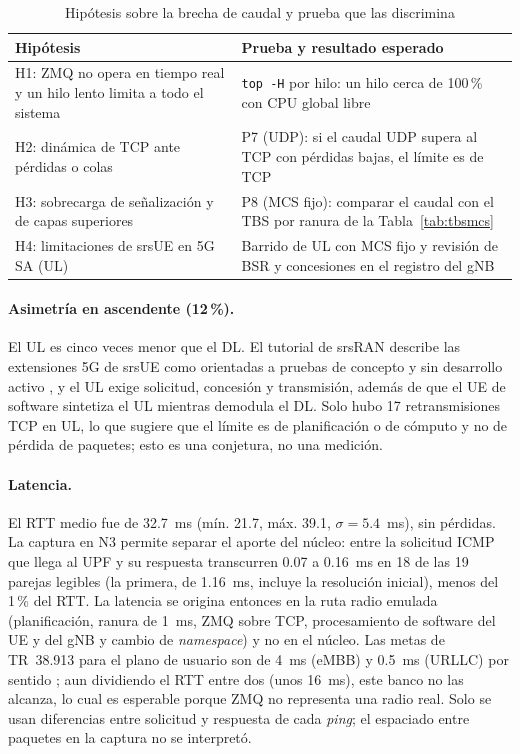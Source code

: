 \documentclass[conference]{IEEEtran}
\begin{document}
\begin{table}[!t]
\caption{Hipótesis sobre la brecha de caudal y prueba que las discrimina}
\label{tab:hip}
\centering
\footnotesize
\renewcommand{\arraystretch}{1.1}
\begin{tabular}{p{2.9cm}p{4.8cm}}
\toprule
\textbf{Hipótesis} & \textbf{Prueba y resultado esperado} \\
\midrule
H1: ZMQ no opera en tiempo real y un hilo lento limita a todo el sistema & \texttt{top -H} por hilo: un hilo cerca de 100\,\% con CPU global libre \\
H2: dinámica de TCP ante pérdidas o colas & P7 (UDP): si el caudal UDP supera al TCP con pérdidas bajas, el límite es de TCP \\
H3: sobrecarga de señalización y de capas superiores & P8 (MCS fijo): comparar el caudal con el TBS por ranura de la Tabla~\ref{tab:tbsmcs} \\
H4: limitaciones de srsUE en 5G SA (UL) & Barrido de UL con MCS fijo y revisión de BSR y concesiones en el registro del gNB \\
\bottomrule
\end{tabular}
\end{table}

\paragraph{Asimetría en ascendente (12\,\%).} El UL es cinco veces menor que el DL. El tutorial de srsRAN describe las extensiones 5G de srsUE como orientadas a pruebas de concepto y sin desarrollo activo \cite{srsuetut}, y el UL exige solicitud, concesión y transmisión, además de que el UE de software sintetiza el UL mientras demodula el DL. Solo hubo 17 retransmisiones TCP en UL, lo que sugiere que el límite es de planificación o de cómputo y no de pérdida de paquetes; esto es una conjetura, no una medición.

\paragraph{Latencia.} El RTT medio fue de 32.7~ms (mín. 21.7, máx. 39.1, $\sigma=5.4$~ms), sin pérdidas. La captura en N3 permite separar el aporte del núcleo: entre la solicitud ICMP que llega al UPF y su respuesta transcurren 0.07 a 0.16~ms en 18 de las 19 parejas legibles (la primera, de 1.16~ms, incluye la resolución inicial), menos del 1\,\% del RTT. La latencia se origina entonces en la ruta radio emulada (planificación, ranura de 1~ms, ZMQ sobre TCP, procesamiento de software del UE y del gNB y cambio de \textit{namespace}) y no en el núcleo. Las metas de TR~38.913 para el plano de usuario son de 4~ms (eMBB) y 0.5~ms (URLLC) por sentido \cite{ts38913}; aun dividiendo el RTT entre dos (unos 16~ms), este banco no las alcanza, lo cual es esperable porque ZMQ no representa una radio real. Solo se usan diferencias entre solicitud y respuesta de cada \textit{ping}; el espaciado entre paquetes en la captura no se interpretó.
\end{document}
